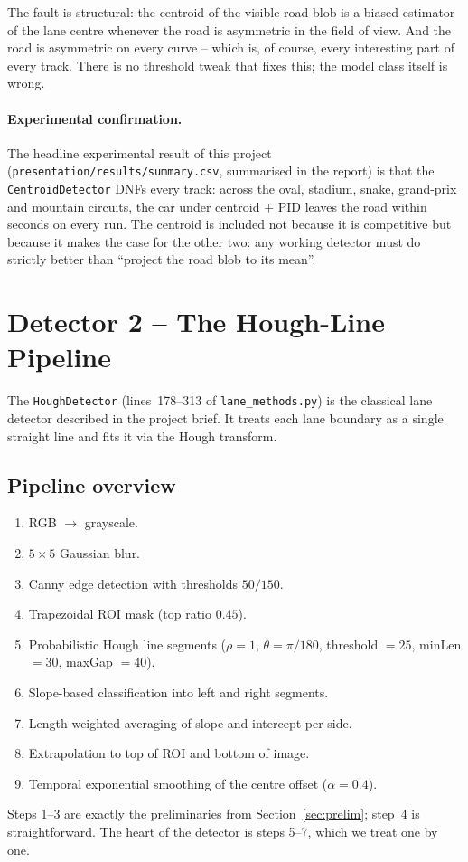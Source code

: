 The fault is structural: the centroid of the visible road blob is a
biased estimator of the lane centre whenever the road is asymmetric in
the field of view. And the road is asymmetric on every curve -- which
is, of course, every interesting part of every track. There is no
threshold tweak that fixes this; the model class itself is wrong.

\paragraph{Experimental confirmation.}
The headline experimental result of this project
(\texttt{presentation/results/summary.csv}, summarised in the report)
is that the \texttt{CentroidDetector} DNFs every track: across the
oval, stadium, snake, grand-prix and mountain circuits, the car under
centroid + PID leaves the road within seconds on every run. The
centroid is included not because it is competitive but because it
makes the case for the other two: any working detector must do
strictly better than ``project the road blob to its mean''.

\section{Detector 2 -- The Hough-Line Pipeline}
\label{sec:hough}

The \texttt{HoughDetector} (lines~178--313 of
\texttt{lane\_methods.py}) is the classical lane detector described in
the project brief. It treats each lane boundary as a single straight
line and fits it via the Hough transform.

\subsection{Pipeline overview}

\begin{enumerate}[leftmargin=1.8em,itemsep=2pt]
  \item RGB $\to$ grayscale.
  \item $5\times 5$ Gaussian blur.
  \item Canny edge detection with thresholds $50/150$.
  \item Trapezoidal ROI mask (top ratio $0.45$).
  \item Probabilistic Hough line segments
        ($\rho=1$, $\theta=\pi/180$, threshold $=25$, minLen $=30$,
        maxGap $=40$).
  \item Slope-based classification into left and right segments.
  \item Length-weighted averaging of slope and intercept per side.
  \item Extrapolation to top of ROI and bottom of image.
  \item Temporal exponential smoothing of the centre offset
        ($\alpha=0.4$).
\end{enumerate}
Steps 1--3 are exactly the preliminaries from
Section~\ref{sec:prelim}; step~4 is straightforward. The heart of the
detector is steps 5--7, which we treat one by one.

